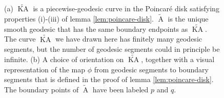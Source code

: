 \documentclass[a4paper,11pt]{article}
\renewcommand{\tilde}{\widetilde}
\newcommand{\KA}{\operatorname{KA}}
\newcommand{\A}{\operatorname{A}}
\begin{document}
\begin{figure}
    \centering
    \caption{(a) $\tilde{\KA}$ is a piecewise-geodesic curve in the Poincar\'{e} disk satisfying properties (i)-(iii) of lemma \ref{lem:poincare-disk}. $\tilde{\A}$ is the unique smooth geodesic that has the same boundary endpoints as $\tilde{\KA}.$ The curve $\tilde{\KA}$ we have drawn here has finitely many geodesic segments, but the number of geodesic segments could in principle be infinite. (b) A choice of orientation on $\tilde{\KA}$, together with a visual representation of the map $\phi$ from geodesic segments to boundary segments that is defined in the proof of lemma \ref{lem:poincare-disk}. The boundary points of $\tilde{\A}$ have been labeled $p$ and $q$.}
\end{figure}
\end{document}
